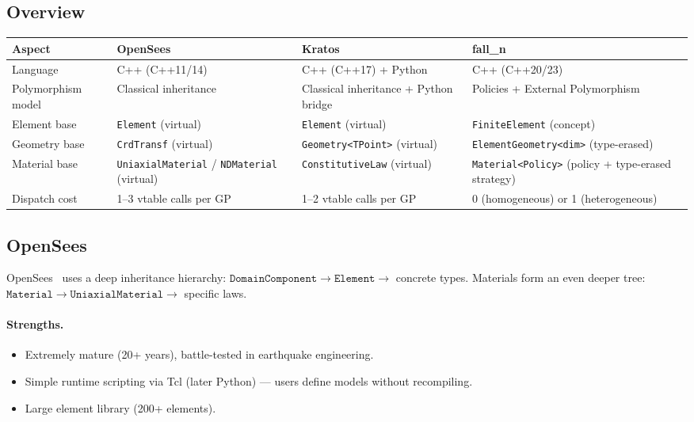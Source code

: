 \subsection{Overview}

\begin{center}
\small
\renewcommand{\arraystretch}{1.2}
\begin{tabular}{p{3.8cm}p{3.8cm}p{3.8cm}p{3.8cm}}
  \toprule
  Aspect & \textbf{OpenSees} & \textbf{Kratos} & \textbf{fall\_n} \\
  \midrule
  Language &
    C++ (C++11/14) &
    C++ (C++17) + Python &
    C++ (C++20/23) \\
  Polymorphism model &
    Classical inheritance &
    Classical inheritance + Python bridge &
    Policies + External Polymorphism \\
  Element base &
    \texttt{Element} (virtual) &
    \texttt{Element} (virtual) &
    \texttt{FiniteElement} (concept) \\
  Geometry base &
    \texttt{CrdTransf} (virtual) &
    \texttt{Geometry<TPoint>} (virtual) &
    \texttt{ElementGeometry<dim>} (type-erased) \\
  Material base &
    \texttt{UniaxialMaterial} / \texttt{NDMaterial} (virtual) &
    \texttt{ConstitutiveLaw} (virtual) &
    \texttt{Material<Policy>} (policy + type-erased strategy) \\
  Dispatch cost &
    1--3 vtable calls per GP &
    1--2 vtable calls per GP &
    0 (homogeneous) or 1 (heterogeneous) \\
  \bottomrule
\end{tabular}
\end{center}

\subsection{OpenSees}

OpenSees~\cite{OpenSees} uses a deep inheritance hierarchy:
$\texttt{DomainComponent} \to \texttt{Element} \to$ concrete types.
Materials form an even deeper tree:
$\texttt{Material} \to \texttt{UniaxialMaterial} \to$ specific laws.

\paragraph{Strengths.}
\begin{itemize}[nosep]
  \item Extremely mature (20+ years), battle-tested in earthquake engineering.
  \item Simple runtime scripting via Tcl (later Python) --- users define
        models without recompiling.
  \item Large element library (200+ elements).
\end{itemize}

